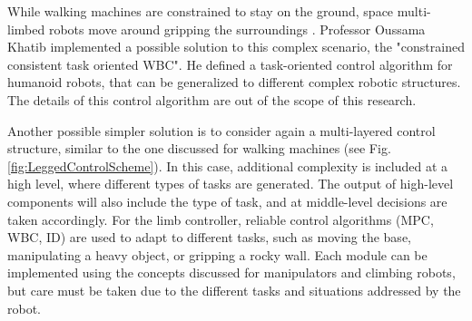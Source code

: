 While walking machines are constrained to stay on the ground, space multi-limbed robots move around gripping the surroundings \cite{Ribeiro2023reaction}\cite{RibeiroGroundGripping}\cite{ISSLimbedRobot}. 
Professor Oussama Khatib implemented a possible solution to this complex scenario, the "constrained consistent task oriented WBC"\cite{KhatibConstrainedConsistentTaskOrientedWBC}. He defined a task-oriented control algorithm for humanoid robots, that can be generalized to different complex robotic structures.  
The details of this control algorithm are out of the scope of this research.

Another possible simpler solution is to consider again a multi-layered control structure, similar to the one discussed for walking machines (see Fig.\ref{fig:LeggedControlScheme}). In this case, additional complexity is included at a high level, where different types of tasks are generated. 
The output of high-level components will also include the type of task, and at middle-level decisions are taken accordingly. For the limb controller, reliable control algorithms (MPC, WBC, ID) are used to adapt to different tasks, such as moving the base, manipulating a heavy object, or gripping a rocky wall. 
Each module can be implemented using the concepts discussed for manipulators and climbing robots, but care must be taken due to the different tasks and situations addressed by the robot. 

